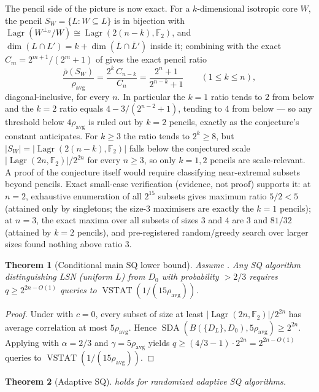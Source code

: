 \documentclass[11pt,a4paper]{article}
\theoremstyle{plain}
\newtheorem{theorem}{Theorem}[section]
\theoremstyle{definition}
\newcommand{\F}{\mathbb{F}}
\DeclareMathOperator{\Lagr}{Lagr}
\DeclareMathOperator{\SDA}{SDA}
\DeclareMathOperator{\VSTAT}{VSTAT}
\begin{document}
The pencil side of the picture is now exact. For a $k$-dimensional isotropic core $W$, the pencil $S_W = \{L : W \subseteq L\}$ is in bijection with $\Lagr(W^{\perp_\Omega}/W) \cong \Lagr(2(n-k),\F_2)$, and $\dim(L \cap L') = k + \dim(\bar L \cap \bar L')$ inside it; combining with the exact $C_m = 2^{m+1}/(2^m+1)$ of  gives the exact pencil ratio
\[
\frac{\bar\rho(S_W)}{\rho_{\mathrm{avg}}} = \frac{2^k\,C_{n-k}}{C_n} = \frac{2^n+1}{2^{n-k}+1}
\qquad (1 \le k \le n),
\]
diagonal-inclusive, for every $n$. In particular the $k=1$ ratio tends to $2$ from below and the $k=2$ ratio equals $4 - 3/(2^{n-2}+1)$, tending to $4$ from below --- so any threshold below $4\rho_{\mathrm{avg}}$ is ruled out by $k=2$ pencils, exactly as the conjecture's constant anticipates. For $k \ge 3$ the ratio tends to $2^k \ge 8$, but $|S_W| = |\Lagr(2(n-k),\F_2)|$ falls below the conjectured scale $|\Lagr(2n,\F_2)|/2^{2n}$ for every $n \ge 3$, so only $k = 1, 2$ pencils are scale-relevant. A proof of the conjecture itself would require classifying near-extremal subsets beyond pencils. Exact small-case verification (evidence, not proof) supports it: at $n=2$, exhaustive enumeration of all $2^{15}$ subsets gives maximum ratio $5/2 < 5$ (attained only by singletons; the size-$3$ maximisers are exactly the $k=1$ pencils); at $n=3$, the exact maxima over all subsets of sizes $3$ and $4$ are $3$ and $81/32$ (attained by $k=2$ pencils), and pre-registered random/greedy search over larger sizes found nothing above ratio $3$.

\begin{theorem}[Conditional main SQ lower bound]
\label{thm:main-sq-cond}
Assume . Any SQ algorithm distinguishing LSN (uniform $L$) from $D_0$ with probability $> 2/3$ requires $q \geq 2^{2n - O(1)}$ queries to $\VSTAT(1/(15\rho_{\mathrm{avg}}))$.
\end{theorem}

\begin{proof}
Under  with $c=0$, every subset of size at least $|\Lagr(2n,\F_2)| / 2^{2n}$ has average correlation at most $5\rho_{\mathrm{avg}}$. Hence $\SDA(B(\{D_L\},D_0), 5\rho_{\mathrm{avg}}) \geq 2^{2n}$. Applying  with $\alpha = 2/3$ and $\gamma = 5\rho_{\mathrm{avg}}$ yields $q \geq (4/3 - 1) \cdot 2^{2n} = 2^{2n - O(1)}$ queries to $\VSTAT(1/(15\rho_{\mathrm{avg}}))$.
\end{proof}

\begin{theorem}[Adaptive SQ]
 holds for randomized adaptive SQ algorithms.
\end{theorem}
\end{document}
